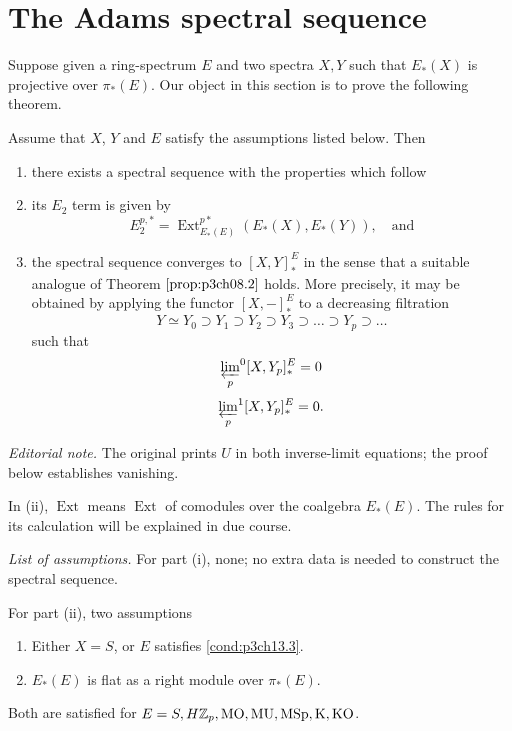 \documentclass[../main]{subfiles}
\begin{document}
\chapter{The Adams spectral sequence}
\label{sec:p3c15}
Suppose given a ring-spectrum $E$ and two spectra $X,Y$ such that $E_\ast(X)$ is projective over $\pi_\ast(E)$. Our object in this section is to prove the following theorem. 

\begin{theorem}\label{thm:p3ch15.1}
Assume that $X$, $Y$ and $E$ satisfy the assumptions listed below. Then
\begin{enumerate}[label=(\roman*)]
    \item there exists a spectral sequence with the properties which follow
    \item its $E_2$ term is given by 
    \[E_2^{p,\ast}=\operatorname{Ext}_{E_\ast(E)}^{p\ast}(E_\ast(X),E_\ast(Y)), \quad \text{and}\]
    \item the spectral sequence converges to $[X,Y]_\ast^E$ in the sense that a suitable analogue of Theorem $\ref{prop:p3ch08.2}$ holds. More precisely, it may be obtained by applying the functor $[X,-]_\ast^E$ to a decreasing filtration
    \[Y\simeq Y_0\supset Y_1\supset Y_2\supset Y_3 \supset \hdots \supset Y_p\supset \hdots\]
    such that 
    \[{\varprojlim_p}^0[X,Y_p]_\ast^E=0\]
    \[{\varprojlim_p}^1[X,Y_p]_\ast^E=0.\]
\end{enumerate}
\noindent\textit{Editorial note.} The original prints $U$ in both inverse-limit equations; the proof below establishes vanishing.
\end{theorem}
\begin{notes}
In (ii), $\operatorname{Ext}$ means $\operatorname{Ext}$ of comodules over the coalgebra $E_\ast(E)$. The rules for its calculation will be explained in due course.
\end{notes}
\par \emph{List of assumptions.} For part (i), none; no extra data is needed to construct the spectral sequence.

For part (ii), two assumptions
\begin{enumerate}
    \item[(a)] Either $X=S$, or $E$ satisfies \ref{cond:p3ch13.3}.
    \item[(b)] $E_\ast(E)$ is flat as a right module over $\pi_\ast(E)$.
\end{enumerate}
Both are satisfied for $E=S, H\mathbb{Z}_p, \mathrm{MO, MU, MSp, K, KO}$.
\end{document}
